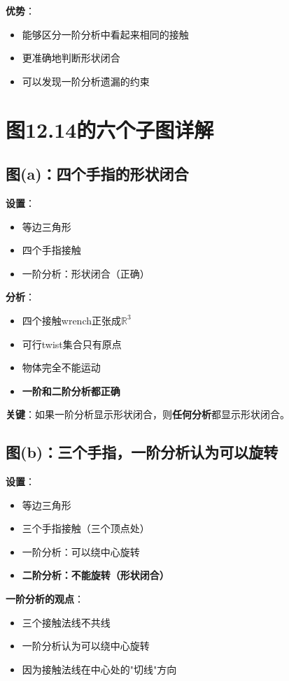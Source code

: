 \documentclass[12pt,a4paper]{article}
\begin{document}
\textbf{优势}：
\begin{itemize}
\item 能够区分一阶分析中看起来相同的接触
\item 更准确地判断形状闭合
\item 可以发现一阶分析遗漏的约束
\end{itemize}

\section{图12.14的六个子图详解}

\subsection{图(a)：四个手指的形状闭合}

\textbf{设置}：
\begin{itemize}
\item 等边三角形
\item 四个手指接触
\item 一阶分析：形状闭合（正确）
\end{itemize}

\textbf{分析}：
\begin{itemize}
\item 四个接触wrench正张成$\mathbb{R}^3$
\item 可行twist集合只有原点
\item 物体完全不能运动
\item \textbf{一阶和二阶分析都正确}
\end{itemize}

\textbf{关键}：如果一阶分析显示形状闭合，则\textbf{任何分析}都显示形状闭合。

\subsection{图(b)：三个手指，一阶分析认为可以旋转}

\textbf{设置}：
\begin{itemize}
\item 等边三角形
\item 三个手指接触（三个顶点处）
\item 一阶分析：可以绕中心旋转
\item \textbf{二阶分析：不能旋转（形状闭合）}
\end{itemize}

\textbf{一阶分析的观点}：
\begin{itemize}
\item 三个接触法线不共线
\item 一阶分析认为可以绕中心旋转
\item 因为接触法线在中心处的"切线"方向
\end{itemize}
\end{document}
